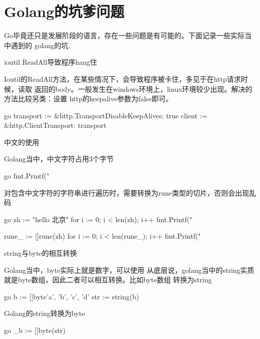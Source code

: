 \section{Golang的坑爹问题}
Go毕竟还只是发展阶段的语言，存在一些问题是有可能的。下面记录一些实际当中遇到的
golang的坑.
\begin{outline}[enumerate]

  \1 ioutil ReadAll导致程序hang住

  Ioutil的ReadAll方法，在某些情况下，会导致程序被卡住，多见于在http请求时候，读取
  返回的body。一般发生在windows环境上，linux环境较少出现。解决的方法比较另类：设置
  http的keepalive参数为false即可。
\begin{code-in-enumerate}{go}
transport := &http.Transport{DisableKeepAlives: true}
client := &http.Client{Transport: transport}
\end{code-in-enumerate}

  \1 中文的使用

  Golang当中，中文字符占用3个字节
\begin{code-in-enumerate}{go}
fmt.Printf("%
\end{code-in-enumerate}

  对包含中文字符的字符串进行遍历时，需要转换为rune类型的切片，否则会出现乱码
\begin{code-in-enumerate}{go}
zh := "hello 北京"
for i := 0; i < len(zh); i++ {
    fmt.Printf("%
}

rune_ := []rune(zh)
for i := 0; i < len(rune_); i++ {
    fmt.Printf("%
}
\end{code-in-enumerate}

  \1 string与byte的相互转换

  Golang当中，byte实际上就是数字，可以使用%
  从底层说，golang当中的string实质就是byte数组，因此二者可以相互转换。比如byte数组
  转换为string
\begin{code-in-enumerate}{go}
b := []byte{'a', 'b', 'c', 'd'}
str := string(b)
\end{code-in-enumerate}

  Golang的string转换为byte
\begin{code-in-enumerate}{go}
_b := []byte(str)
\end{code-in-enumerate}

\end{outline}

